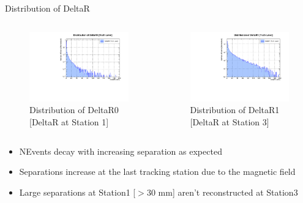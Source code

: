 \begin{frame}{Distribution of DeltaR}
	\begin{columns}
		\begin{column}{0.5\linewidth}
			\begin{figure}
				\includegraphics[width=\linewidth]{./output/DeltaR0.pdf}
				\caption{\tiny Distribution of DeltaR0 [DeltaR at Station 1]}
			\end{figure}
		\end{column}
		\begin{column}{0.5\linewidth}
			\begin{figure}
				\includegraphics[width=\linewidth]{./output/DeltaR1.pdf}
				\caption{\tiny Distribution of DeltaR1 [DeltaR at Station 3]}
			\end{figure}
		\end{column}
	\end{columns}
	\vspace{0.5cm}
	\begin{itemize}
		\scriptsize
		\item NEvents decay with increasing separation as expected
		\item Separations increase at the last tracking station due to the magnetic field
		\item Large separations at Station1 [$>$30 mm] aren't reconstructed at Station3
	\end{itemize}
\end{frame}

